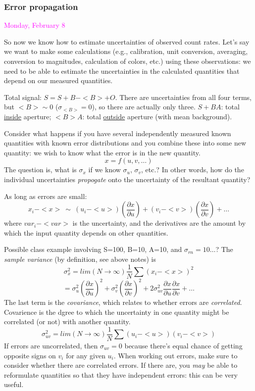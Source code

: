 \documentclass[12pt]{article}
\begin{document}
\subsubsection*{Error propagation}
\textcolor{magenta}{Monday, February 8}

So now we know how to estimate uncertainties of observed count rates.
Let's say we want to make some calculations (e.g., calibration, unit
conversion, averaging, conversion to magnitudes, calculation of
colors, etc.) using these observations: we need to be able to estimate
the uncertainties in the calculated quantities that depend on our
measured quantities.

\textcolor{myBlue}{
Total signal: $ S=S+B-<B>+O $. There are uncertainties from all
four terms, but $<B> \sim 0$ ($\sigma_{<B>}=0$), so there are
actually only three. $S+BA$: total \underline{inside} aperture;
$<B>A$: total \underline{outside} aperture (with mean background).}

Consider what happens if you have several independently measured
known quantities with known
error distributions and you combine these into some new quantity: we
wish to know what the error is in the new quantity.
    $$ x = f(u, v, \ldots) $$
The question is, what is $\sigma_x$ if we know
$\sigma_u$, $\sigma_v$, etc.?
\textcolor{myBlue}{In other words, how do the individual uncertainties
\emph{propogate} onto the uncertainty of the resultant quantity?}

As long as errors are small:
    $$ x_i - <x> \ \sim \
        (u_i - <u>)\left(\frac{\partial x}{\partial u}\right)
       + (v_i - <v>)\left( \frac{\partial x}{\partial v}  \right)
       + \ldots  $$
where $var_i - <var>$ is the uncertainty, and the derivatives are the
amount by which the input quantity depends on other quantities.

\textcolor{myBlue}{
Possible class example involving
S=100, B=10, A=10, and $\sigma_{rn}=10\ldots$?
The \emph{sample variance} (by definition, see above notes) is}
    $$ \sigma_x^2 = lim(N \rightarrow \infty)\frac{1}{N}
       \sum(x_i - <x>)^2 $$
    $$ = \sigma_u^2\left(\frac{\partial x}{\partial u}\right)^2
       + \sigma_v^2\left(\frac{\partial x}{\partial v}\right)^2
       + 2\sigma_{uv}^2\frac{\partial x}{\partial u}
         \frac{\partial x}{\partial v} + \ldots $$
The last term is the \emph{covariance}, which relates to whether
errors are \emph{correlated}.
\textcolor{myBlue}{Covarience is the dgree to which the uncertainty
in one quantity might be correlated (or not) with another quantity}.
    $$ \sigma_{uv}^2 = lim(N \rightarrow\infty)\frac{1}{N}
       \sum(u_i - <u>)(v_i - <v>)  $$
If errors are uncorrelated, then $\sigma_{uv} = 0$ because there's
equal chance of getting opposite signs on $v_i$ for any given $u_i$.
When working out errors, make sure to consider whether there are
correlated errors. If there are, you \emph{may} be able to reformulate
quantities so that they have independent errors: this can be very
useful.
\end{document}

